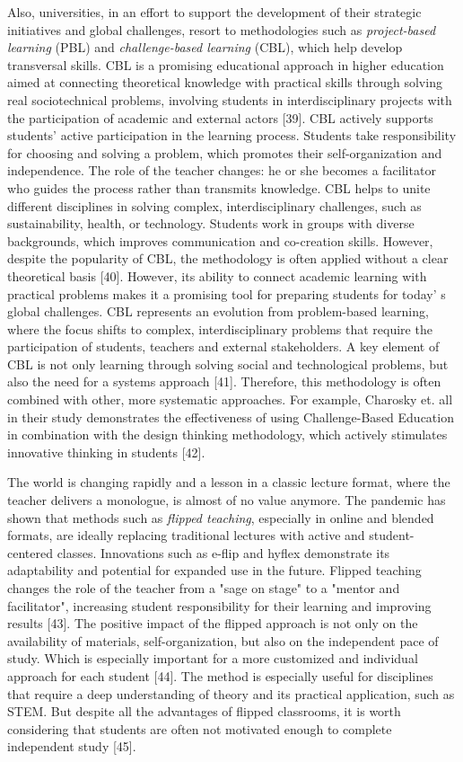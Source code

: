 Also, universities, in an effort to support the development of their
strategic initiatives and global challenges, resort to methodologies
such as \emph{project-based learning} (PBL) and \emph{challenge-based
learning} (CBL), which help develop transversal skills. CBL is a
promising educational approach in higher education aimed at connecting
theoretical knowledge with practical skills through solving real
sociotechnical problems, involving students in interdisciplinary
projects with the participation of academic and external actors
{[}39{]}. CBL actively supports students' active participation in the
learning process. Students take responsibility for choosing and solving
a problem, which promotes their self-organization and independence. The
role of the teacher changes: he or she becomes a facilitator who guides
the process rather than transmits knowledge. CBL helps to unite
different disciplines in solving complex, interdisciplinary challenges,
such as sustainability, health, or technology. Students work in groups
with diverse backgrounds, which improves communication and co-creation
skills. However, despite the popularity of CBL, the methodology is often
applied without a clear theoretical basis {[}40{]}. However, its ability
to connect academic learning with practical problems makes it a
promising tool for preparing students for today' s global
challenges. CBL represents an evolution from problem-based learning,
where the focus shifts to complex, interdisciplinary problems that
require the participation of students, teachers and external
stakeholders. A key element of CBL is not only learning through solving
social and technological problems, but also the need for a systems
approach {[}41{]}. Therefore, this methodology is often combined with
other, more systematic approaches. For example, Charosky et. all in
their study demonstrates the effectiveness of using Challenge-Based
Education in combination with the design thinking methodology, which
actively stimulates innovative thinking in students {[}42{]}.

The world is changing rapidly and a lesson in a classic lecture format,
where the teacher delivers a monologue, is almost of no value anymore.
The pandemic has shown that methods such as \emph{flipped teaching},
especially in online and blended formats, are ideally replacing
traditional lectures with active and student-centered classes.
Innovations such as e-flip and hyflex demonstrate its adaptability and
potential for expanded use in the future. Flipped teaching changes the
role of the teacher from a "sage on stage" to a "mentor and
facilitator", increasing student responsibility for their learning and
improving results {[}43{]}. The positive impact of the flipped approach
is not only on the availability of materials, self-organization, but
also on the independent pace of study. Which is especially important for
a more customized and individual approach for each student {[}44{]}. The
method is especially useful for disciplines that require a deep
understanding of theory and its practical application, such as STEM. But
despite all the advantages of flipped classrooms, it is worth
considering that students are often not motivated enough to complete
independent study {[}45{]}.

